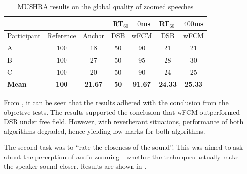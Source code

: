 \documentclass[a4paper,twoside,12pt,hidelinks]{article}
\begin{document}
\begin{table}[H]
\centering
\begin{tabular}{lcc|c|c|c|c|}
\cline{4-7}
 &  &  & \multicolumn{2}{c|}{RT$_{60}=0$ms} & \multicolumn{2}{c|}{RT$_{60}=400$ms} \\ \hline
\multicolumn{1}{|l|}{Participant} & \multicolumn{1}{c|}{Reference} & Anchor & DSB & wFCM & DSB & wFCM \\ \hline
\multicolumn{1}{|l|}{A} & \multicolumn{1}{c|}{100} & 18 & 50 & 90 & 21 & 21 \\ \hline
\multicolumn{1}{|l|}{B} & \multicolumn{1}{c|}{100} & 27 & 50 & 95 & 28 & 30 \\ \hline
\multicolumn{1}{|l|}{C} & \multicolumn{1}{c|}{100} & 20 & 50 & 90 & 24 & 25 \\ \hline
\multicolumn{1}{|l|}{\textbf{Mean}} & \multicolumn{1}{c|}{\textbf{100}} & \textbf{21.67} & \textbf{50} & \textbf{91.67} & \textbf{24.33} & \textbf{25.33} \\ \hline
\end{tabular}
\caption{MUSHRA results on the global quality of zoomed speeches}
\label{table:globalquality}
\end{table}

From , it can be seen that the results adhered with the conclusion from the objective tests. The results supported the conclusion that wFCM outperformed DSB under free field. However, with reverberant situations, performance of both algorithms degraded, hence yielding low marks for both algorithms. 

The second task was to ``rate the closeness of the sound''. This was aimed to ask about the perception of audio zooming - whether the techniques actually make the speaker sound closer. Results are shown in .
\end{document}
